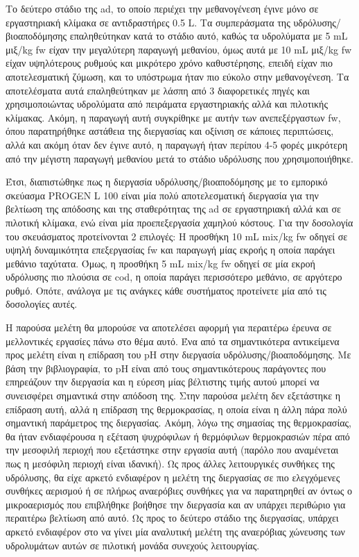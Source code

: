 \documentclass[11pt]{report}
\begin{document}
Το δεύτερο στάδιο της \acrshort{ad}, το οποίο περιέχει την μεθανογένεση έγινε μόνο σε εργαστηριακή κλίμακα σε αντιδραστήρες 0.5 L. Τα συμπεράσματα της υδρόλυσης/βιοαποδόμησης επαληθεύτηκαν κατά το στάδιο αυτό, καθώς τα υδρολύματα με 5 mL μιξ/kg \acrshort{fw} είχαν την μεγαλύτερη παραγωγή μεθανίου, όμως αυτά με 10 mL μιξ/kg \acrshort{fw} είχαν υψηλότερους ρυθμούς και μικρότερο χρόνο καθυστέρησης, επειδή είχαν πιο αποτελεσματική ζύμωση, και το υπόστρωμα ήταν πιο εύκολο στην μεθανογένεση. Τα αποτελέσματα αυτά επαληθεύτηκαν με λάσπη από 3 διαφορετικές πηγές και χρησιμοποιώντας υδρολύματα από πειράματα εργαστηριακής αλλά και πιλοτικής κλίμακας. Ακόμη, η παραγωγή αυτή συγκρίθηκε με αυτήν των ανεπεξέργαστων \acrshort{fw}, όπου παρατηρήθηκε αστάθεια της διεργασίας και οξίνιση σε κάποιες περιπτώσεις, αλλά και ακόμη όταν δεν έγινε αυτό, η παραγωγή ήταν περίπου 4-5 φορές μικρότερη από την μέγιστη παραγωγή μεθανίου μετά το στάδιο υδρόλυσης που χρησιμοποιήθηκε.

Έτσι, διαπιστώθηκε πως η διεργασία υδρόλυσης/βιοαποδόμησης με το εμπορικό σκεύασμα PROGEN L 100 είναι μία πολύ αποτελεσματική διεργασία για την βελτίωση της απόδοσης και της σταθερότητας της \acrshort{ad} σε εργαστηριακή αλλά και σε πιλοτική κλίμακα, ενώ είναι μία προεπεξεργασία χαμηλού κόστους. Για την δοσολογία του σκευάσματος προτείνονται 2 επιλογές: Η προσθήκη 10 mL \acrshort{mix}/kg \acrshort{fw} οδηγεί σε υψηλή δυναμικότητα επεξεργασίας \acrshort{fw} και παραγωγή μίας εκροής η οποία παράγει μεθάνιο ταχύτατα. Όμως, η προσθήκη 5 mL \acrshort{mix}/kg \acrshort{fw} οδηγεί σε μία εκροή υδρόλυσης πιο πλούσια σε \acrshort{cod}, η οποία παράγει περισσότερο μεθάνιο, σε αργότερο ρυθμό. Οπότε, ανάλογα με τις ανάγκες κάθε συστήματος προτείνετε μία από τις δοσολογίες αυτές.

Η παρούσα μελέτη θα μπορούσε να αποτελέσει αφορμή για περαιτέρω έρευνα σε μελλοντικές εργασίες πάνω στο θέμα αυτό. Ένα από τα σημαντικότερα αντικείμενα προς μελέτη είναι η επίδραση του pH στην διεργασία υδρόλυσης/βιοαποδόμησης. Με βάση την βιβλιογραφία, το pH είναι από τους σημαντικότερους παράγοντες που επηρεάζουν την διεργασία και η εύρεση μίας βέλτιστης τιμής αυτού μπορεί να συνεισφέρει σημαντικά στην απόδοση της. Στην παρούσα μελέτη δεν εξετάστηκε η επίδραση αυτή, αλλά η επίδραση της θερμοκρασίας, η οποία είναι η άλλη πάρα πολύ σημαντική παράμετρος της διεργασίας. Ακόμη, λόγω της σημασίας της θερμοκρασίας, θα ήταν ενδιαφέρουσα η εξέταση ψυχρόφιλων ή θερμόφιλων θερμοκρασιών πέρα από την μεσοφιλή περιοχή που εξετάστηκε στην εργασία αυτή (παρόλο που αναμένεται πως η μεσόφιλη περιοχή είναι ιδανική). Ως προς άλλες λειτουργικές συνθήκες της υδρόλυσης, θα είχε αρκετό ενδιαφέρον η μελέτη της διεργασίας σε πιο ελεγχόμενες συνθήκες αερισμού ή σε πλήρως αναερόβιες συνθήκες για να παρατηρηθεί αν όντως ο μικροαερισμός που επιβλήθηκε βοήθησε την διεργασία και αν υπάρχει περιθώριο για περαιτέρω βελτίωση από αυτό. Ως προς το δεύτερο στάδιο της διεργασίας, υπάρχει αρκετό ενδιαφέρον στο να γίνει μία αναλυτική μελέτη της αναερόβιας χώνευσης των υδρολυμάτων αυτών σε πιλοτική μονάδα συνεχούς λειτουργίας.
\end{document}
